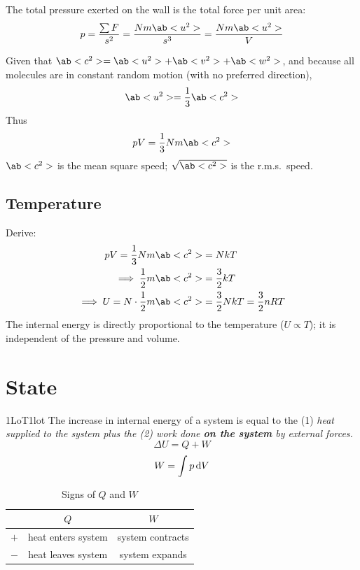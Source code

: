 The total pressure exerted on the wall is the total force per unit area:
\[p = \f{\sum F}{s^2} = \f{Nm\ab<u^2>}{s^3} = \f{Nm\ab<u^2>}{V}\]

Given that \(\ab<c^2> = \ab<u^2> + \ab<v^2> + \ab<w^2>\), and
because all molecules are in constant random motion (with no preferred direction),
\[\ab<u^2> = \f{1}{3}\ab<c^2>\]
Thus
\begin{equation*}
	pV = \f{1}{3}Nm\ab<c^2>
\end{equation*}
\(\ab<c^2>\) is the mean square speed; \(\sqrt{\ab<c^2>}\) is the r.m.s.~speed.

\subsection{Temperature}
Derive:
\begin{align*}
	pV = \f{1}{3}Nm\ab<c^2>               & = NkT                        \\
	\implies \f{1}{2}m\ab<c^2>            & = \f{3}{2}kT                 \\
	\implies U =  N\cdot\f{1}{2}m\ab<c^2> & = \f{3}{2}NkT  = \f{3}{2}nRT \\
\end{align*}
The internal energy is directly proportional to the temperature (\(U\propto T\)); it is independent of the pressure and volume.

\section{State}
\begin{definition}{1LoT}{1lot}
	The increase in internal energy of a system is equal to
	the (1) \it{heat supplied to the system} plus the (2) \it{work done \bf{on the system}} by external forces.
	\[\Delta U = Q + W\]
	\small \[W = \int p\odif{V}\]
\end{definition}
\begin{table}[htpb]
	\centering
	\begin{tabular}{r c c}
		\toprule
		      & \(Q\)              & \(W\)            \\
		\midrule
		\(+\) & heat enters system & system contracts \\
		\(-\) & heat leaves system & system expands   \\
		\bottomrule
	\end{tabular}
	\label{tab:q-and-w}
	\caption{Signs of \(Q\) and \(W\)}
\end{table}

